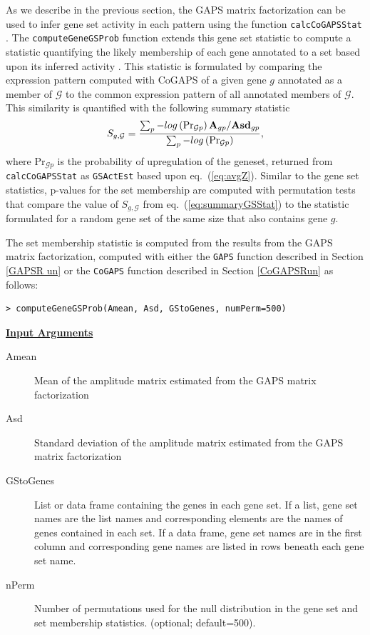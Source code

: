 \documentclass{report}
\begin{document}
\par As we describe in the previous section, the GAPS matrix factorization can be used to infer gene set activity in each pattern using the function \texttt{calcCoGAPSStat} \cite{Ochs2009}.  The \texttt{computeGeneGSProb} function extends this gene set statistic to compute a statistic quantifying the likely membership of each gene annotated to a set based upon its inferred activity \cite{Fertig2012}.  This statistic is formulated by comparing the expression pattern computed with CoGAPS of a given gene $g$ annotated as a member of $\mathcal{G}$ to the common expression pattern of all annotated members of $\mathcal{G}$.  This similarity is quantified with the following summary statistic
\begin{equation}
S_{g,\mathcal{G}} = \frac{\sum_{p} -log\left(\mbox{Pr}_{\mathcal{G}p}\right){\bf{A}}_{gp}/{\bf{Asd}}_{gp}}{\sum_{p} -log\left(\mbox{Pr}_{\mathcal{G}p}\right)},
\label{eq:summaryGSStat}
\end{equation}
where $\mbox{Pr}_{\mathcal{G}p}$ is the probability of upregulation of the geneset, returned from \texttt{calcCoGAPSStat} as \texttt{GSActEst} based upon eq.~(\ref{eq:avgZ}).  Similar to the gene set statistics, p-values for the set membership are computed with permutation tests that compare the value of $S_{g,\mathcal{G}}$ from eq.~(\ref{eq:summaryGSStat}) to the statistic formulated for a random gene set of the same size that also contains gene $g$.

\par The set membership statistic is computed from the results from the GAPS matrix factorization, computed with either the \texttt{GAPS} function described in Section \ref{GAPSR un} or the \texttt{CoGAPS} function described in Section \ref{CoGAPSRun} as follows:
\begin{verbatim}
> computeGeneGSProb(Amean, Asd, GStoGenes, numPerm=500)
\end{verbatim}

\par \noindent \textbf{\underline{Input Arguments}}
\begin{description}
\item[Amean]{Mean of the amplitude matrix estimated from the GAPS matrix factorization}
\item[Asd]{Standard deviation of the amplitude matrix estimated from the GAPS matrix factorization}
\item[GStoGenes]{List or data frame containing the genes in each gene set. If a list, gene set names are the list names and corresponding elements are the names of genes contained in each set. If a data frame, gene set names are in the first column and corresponding gene names are listed in rows beneath each gene set name.}
\item[nPerm]{Number of permutations used for the null distribution in the gene set and set membership statistics. (optional; default=500).}
\end{description}
\end{document}
